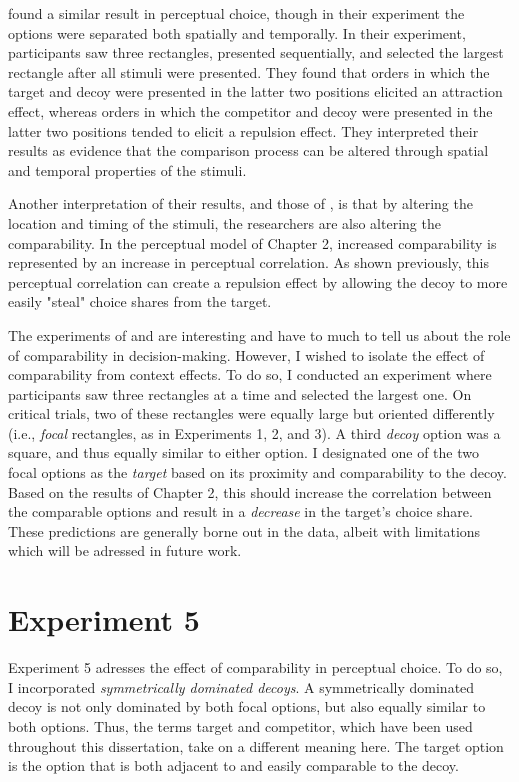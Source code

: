 \textcite{evansImpactPresentationOrder2021} found a similar result in perceptual choice, though in their experiment the options were separated both spatially and temporally. In their experiment, participants saw three rectangles, presented sequentially, and selected the largest rectangle after all stimuli were presented. They found that orders in which the target and decoy were presented in the latter two positions elicited an attraction effect, whereas orders in which the competitor and decoy were presented in the latter two positions tended to elicit a repulsion effect. They interpreted their results as evidence that the comparison process can be altered through spatial and temporal properties of the stimuli.

Another interpretation of their results, and those of \textcite{trueblood2022attentional}, is that by altering the location and timing of the stimuli, the researchers are also altering the comparability. In the perceptual model of Chapter 2, increased comparability is represented by an increase in perceptual correlation. As shown previously, this perceptual correlation can create a repulsion effect by allowing the decoy to more easily "steal" choice shares from the target.

The experiments of \textcite{evansImpactPresentationOrder2021} and \textcite{trueblood2015fragile} are interesting and have to much to tell us about the role of comparability in decision-making. However, I wished to isolate the effect of comparability from context effects. To do so, I conducted an experiment where participants saw three rectangles at a time and selected the largest one. On critical trials, two of these rectangles were equally large but oriented differently (i.e., \textit{focal} rectangles, as in Experiments 1, 2, and 3). A third \textit{decoy} option was a square, and thus equally similar to either option. I designated one of the two focal options as the \textit{target} based on its proximity and comparability to the decoy. Based on the results of Chapter 2, this should increase the correlation between the comparable options and result in a \textit{decrease} in the target's choice share. These predictions are generally borne out in the data, albeit with limitations which will be adressed in future work.

\section{Experiment 5}
Experiment 5 adresses the effect of comparability in perceptual choice. To do so, I incorporated \textit{symmetrically dominated decoys}. A symmetrically dominated decoy is not only dominated by both focal options, but also equally similar to both options. Thus, the terms target and competitor, which have been used throughout this dissertation, take on a different meaning here. The target option is the option that is both adjacent to and easily comparable to the decoy.

